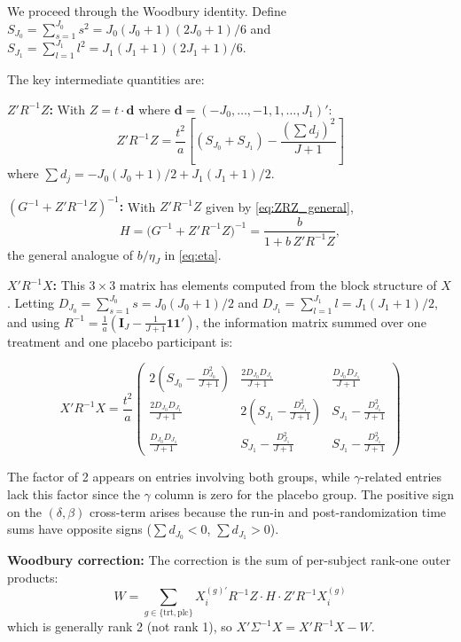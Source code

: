 \documentclass[
  11pt,
]{article}
\begin{document}
We proceed through the Woodbury identity. Define
\(S_{J_0} = \sum_{s=1}^{J_0} s^2 = J_0(J_0+1)(2J_0+1)/6\) and
\(S_{J_1} = \sum_{l=1}^{J_1} l^2 = J_1(J_1+1)(2J_1+1)/6\).

The key intermediate quantities are:

\textbf{\(Z'R^{-1}Z\):} With \(Z = t \cdot \mathbf{d}\) where
\(\mathbf{d} = (-J_0,\ldots,-1,1,\ldots,J_1)'\):
\begin{equation}
  Z'R^{-1}Z = \frac{t^2}{a}\left[
    (S_{J_0} + S_{J_1})
    - \frac{(\sum d_j)^2}{J+1}
  \right]
  \label{eq:ZRZ_general}
\end{equation}
where \(\sum d_j = -J_0(J_0+1)/2 + J_1(J_1+1)/2\).

\textbf{\((G^{-1} + Z'R^{-1}Z)^{-1}\):} With \(Z'R^{-1}Z\) given by
\eqref{eq:ZRZ_general},
\[
  H = \bigl(G^{-1} + Z'R^{-1}Z\bigr)^{-1}
  = \frac{b}{1 + b\, Z'R^{-1}Z},
\]
the general analogue of \(b/\eta_J\) in \eqref{eq:eta}.

\textbf{\(X'R^{-1}X\):} This \(3 \times 3\) matrix has elements
computed from the block structure of \(X\). Letting
\(D_{J_0} = \sum_{s=1}^{J_0} s = J_0(J_0+1)/2\) and
\(D_{J_1} = \sum_{l=1}^{J_1} l = J_1(J_1+1)/2\), and using
\(R^{-1} = \frac{1}{a}(\mathbf{I}_J -
\frac{1}{J+1}\mathbf{1}\mathbf{1}')\), the information matrix
summed over one treatment and one placebo participant is:

\begin{equation}
  X'R^{-1}X = \frac{t^2}{a}\begin{pmatrix}
    2\!\left(S_{J_0} - \frac{D_{J_0}^2}{J+1}\right) &
    \frac{2D_{J_0} D_{J_1}}{J+1} &
    \frac{D_{J_0} D_{J_1}}{J+1} \\[4pt]
    \frac{2D_{J_0} D_{J_1}}{J+1} &
    2\!\left(S_{J_1} - \frac{D_{J_1}^2}{J+1}\right) &
    S_{J_1} - \frac{D_{J_1}^2}{J+1} \\[4pt]
    \frac{D_{J_0} D_{J_1}}{J+1} &
    S_{J_1} - \frac{D_{J_1}^2}{J+1} &
    S_{J_1} - \frac{D_{J_1}^2}{J+1}
  \end{pmatrix}
  \label{eq:XRX_general}
\end{equation}

The factor of 2 appears on entries involving both groups,
while \(\gamma\)-related entries lack this factor since
the \(\gamma\) column is zero for the placebo group. The
positive sign on the \((\delta, \beta)\) cross-term arises
because the run-in and post-randomization time sums have
opposite signs (\(\sum d_{J_0} < 0\), \(\sum d_{J_1} > 0\)).

\textbf{Woodbury correction:} The correction is the sum of
per-subject rank-one outer products:
\[
  W = \sum_{g \in \{\text{trt},\text{plc}\}}
    X_i^{(g)\prime} R^{-1} Z \cdot H \cdot
    Z' R^{-1} X_i^{(g)}
\]
which is generally rank 2 (not rank 1), so
\(X'\Sigma^{-1}X = X'R^{-1}X - W\).
\end{document}
